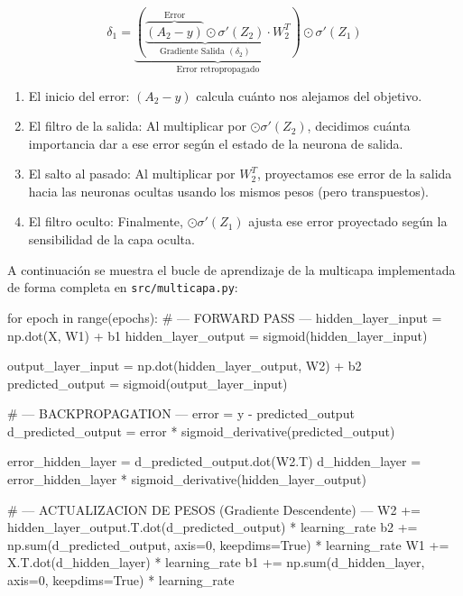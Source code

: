 \documentclass[a4paper,11pt]{article}
\renewenvironment{equation}{\begin{equation*}}{\end{equation*}}
\let\oldequation\equation
\let\endoldequation\endequation
\renewenvironment{equation}
  {\vspace{0.5em}\oldequation}
  {\endoldequation\vspace{0.5em}}
\begin{document}
\begin{equation}\delta_{1} = \underbrace{\left( \underbrace{\overbrace{(A_2 - y)}^\text{Error} \odot \sigma'(Z_2)}_{\text{Gradiente Salida } (\delta_2)} \cdot W_2^T \right)}_{\text{Error retropropagado}} \odot \sigma'(Z_1)\end{equation}

\begin{enumerate}
\item
  El inicio del error: \((A_2 - y)\) calcula cuánto nos alejamos del
  objetivo.
\item
  El filtro de la salida: Al multiplicar por \(\odot \sigma'(Z_2)\),
  decidimos cuánta importancia dar a ese error según el estado de la
  neurona de salida.
\item
  El salto al pasado: Al multiplicar por \(W_2^T\), proyectamos ese
  error de la salida hacia las neuronas ocultas usando los mismos pesos
  (pero transpuestos).
\item
  El filtro oculto: Finalmente, \(\odot \sigma'(Z_1)\) ajusta ese error
  proyectado según la sensibilidad de la capa oculta.
\end{enumerate}

A continuación se muestra el bucle de aprendizaje de la multicapa
implementada de forma completa en \texttt{src/multicapa.py}:

\begin{codigo}
for epoch in range(epochs):
    # --- FORWARD PASS ---
    hidden_layer_input = np.dot(X, W1) + b1
    hidden_layer_output = sigmoid(hidden_layer_input)
    
    output_layer_input = np.dot(hidden_layer_output, W2) + b2
    predicted_output = sigmoid(output_layer_input)

    # --- BACKPROPAGATION ---
    error = y - predicted_output
    d_predicted_output = error * sigmoid_derivative(predicted_output)
    
    error_hidden_layer = d_predicted_output.dot(W2.T)
    d_hidden_layer = error_hidden_layer * sigmoid_derivative(hidden_layer_output)

    # --- ACTUALIZACION DE PESOS (Gradiente Descendente) ---
    W2 += hidden_layer_output.T.dot(d_predicted_output) * learning_rate
    b2 += np.sum(d_predicted_output, axis=0, keepdims=True) * learning_rate
    W1 += X.T.dot(d_hidden_layer) * learning_rate
    b1 += np.sum(d_hidden_layer, axis=0, keepdims=True) * learning_rate
\end{codigo}
\end{document}
